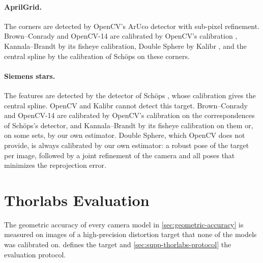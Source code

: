 \paragraph{AprilGrid.} The corners are detected by OpenCV's ArUco
detector \cite{garrido2014aruco} with sub-pixel refinement.
Brown--Conrady and OpenCV-14 are calibrated by OpenCV's calibration
\cite{opencv_library,zhang2000flexible}, Kannala--Brandt by its
fisheye calibration, Double Sphere by Kalibr
\cite{furgale2013unified}, and the central spline by the calibration
of Schöps \etal \cite{10000params} on these corners.

\paragraph{Siemens stars.} The features are detected by the detector
of Schöps \etal \cite{10000params}, whose calibration gives the
central spline. OpenCV and Kalibr cannot detect this target.
Brown--Conrady and OpenCV-14 are calibrated by OpenCV's calibration on
the correspondences of Schöps's detector, and Kannala--Brandt by its
fisheye calibration on them or, on some sets, by our own estimator.
Double Sphere, which OpenCV does not provide, is always calibrated by
our own estimator: a robust pose of the target per image, followed by
a joint refinement of the camera and all poses that minimizes the
reprojection error.


\section{Thorlabs Evaluation}
\label{sec:supp-chrome-evaluation}
The geometric accuracy of every camera model in \cref{sec:geometric-accuracy} is measured on images of a high-precision distortion target that none of the models was calibrated on.  defines the target and \cref{sec:supp-thorlabs-protocol} the evaluation protocol.

